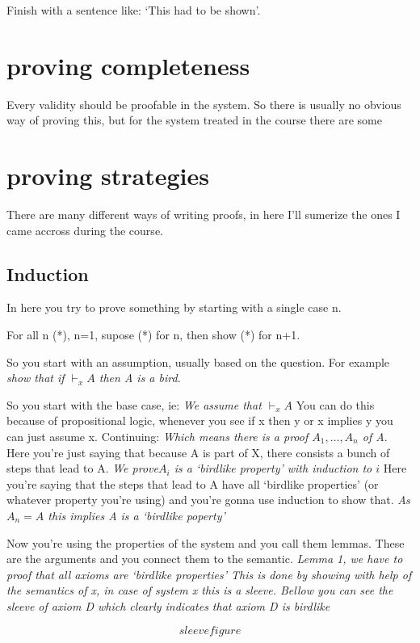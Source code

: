 \documentclass{article}
\begin{document}
Finish with a sentence like: `This had to be shown'.

\section{proving completeness}
Every validity should be proofable in the system. So there is usually no 
obvious way of proving this, but for the system treated in the course
there are some 

\section{proving strategies}
\label{strategies}
There are many different ways of writing proofs, in here I'll sumerize the ones
I came accross during the course.

\subsection{Induction}
\label{induction}
In here you try to prove something by starting with a single case n.

For all n (*), n=1, supose (*) for n, then show (*) for n+1.

So you start with an assumption, usually based on the question.
For example \emph{show that if $\vdash_x A$ then A is a bird.}

So you start with the base case, ie: \emph{We assume that $\vdash_x A$}
You can do this because of propositional logic, whenever you see
if x then y or x implies y you can just assume x. Continuing:
\emph{Which means there is a proof $A_1,\ldots,A_n$ of A}.
Here you're just saying that because A is part of X, there consists
a bunch of steps that lead to A. \emph{We prove$A_i$ is a
`birdlike property' with induction to $i$} Here you're saying
that the steps that lead to A have all `birdlike properties' (or whatever
property you're using) and you're gonna use induction to show that.
\emph{As $A_n = A$ this implies A is a `birdlike poperty'}

Now you're using the properties of the system and you call them lemmas.
These are the arguments and you connect them to the semantic.
\emph{Lemma 1, we have to proof that all axioms are `birdlike properties'
	This is done by showing with help of the semantics of x, in case of
system x this is a sleeve.
Bellow you can see the sleeve of axiom D which clearly indicates that
axiom D is birdlike
}

\[sleevefigure\]
\end{document}
